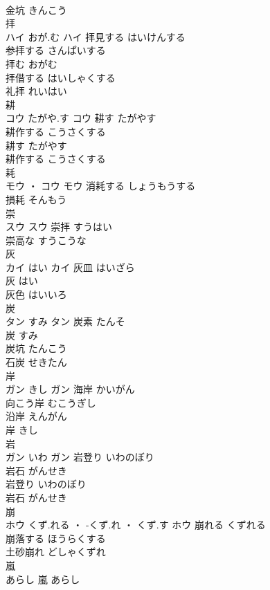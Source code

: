 \documentclass[8pt]{extreport}
\begin{document}
\begin{CJK}{UTF8}{min}
\\	金坑	きんこう	
\\	拝	
\\	ハイ	おが.む	ハイ	拝見する	はいけんする	
\\	参拝する	さんぱいする	
\\	拝む	おがむ	
\\	拝借する	はいしゃくする	
\\	礼拝	れいはい	
\\	耕	
\\	コウ	たがや.す	コウ	耕す	たがやす	
\\	耕作する	こうさくする	
\\	耕す	たがやす	
\\	耕作する	こうさくする	
\\	耗	
\\	モウ ・ コウ		モウ	消耗する	しょうもうする	
\\	損耗	そんもう	
\\	崇	
\\	スウ		スウ	崇拝	すうはい	
\\	崇高な	すうこうな	
\\	灰	
\\	カイ	はい	カイ	灰皿	はいざら	
\\	灰	はい	
\\	灰色	はいいろ	
\\	炭	
\\	タン	すみ	タン	炭素	たんそ	
\\	炭	すみ	
\\	炭坑	たんこう	
\\	石炭	せきたん	
\\	岸	
\\	ガン	きし	ガン	海岸	かいがん	
\\	向こう岸	むこうぎし	
\\	沿岸	えんがん	
\\	岸	きし	
\\	岩	
\\	ガン	いわ	ガン	岩登り	いわのぼり	
\\	岩石	がんせき	
\\	岩登り	いわのぼり	
\\	岩石	がんせき	
\\	崩	
\\	ホウ	くず.れる ・ -くず.れ ・ くず.す	ホウ	崩れる	くずれる	
\\	崩落する	ほうらくする	
\\	土砂崩れ	どしゃくずれ	
\\	嵐	
\\	あらし														嵐	あらし	

\end{CJK}
\end{document}
